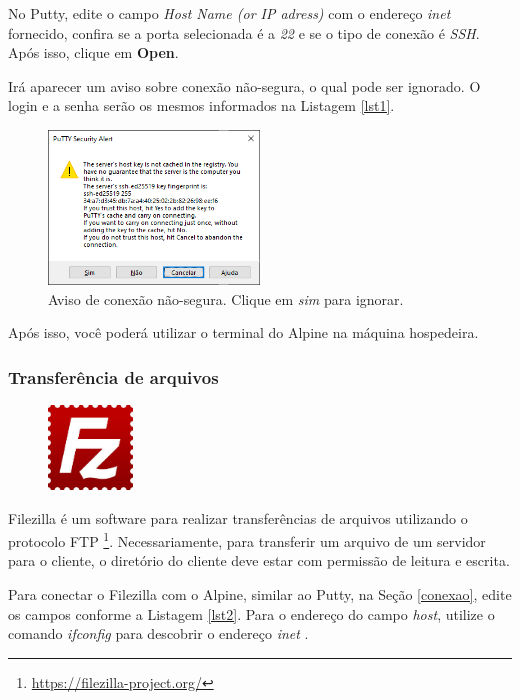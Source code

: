  No Putty, edite o campo \textit{Host Name (or IP adress)} com o endereço \textit{inet} fornecido, confira se a porta selecionada é a \textit{22} e se o tipo de conexão é \textit{SSH}. Após isso, clique em \textbf{Open}.

 Irá aparecer um aviso sobre conexão não-segura, o qual pode ser ignorado. O login e a senha serão os mesmos informados na Listagem \ref{lst1}.

 \begin{figure}[h]
    \centering
    \includegraphics[width=0.5\textwidth]{images/putty4.png}
    \caption{Aviso de conexão não-segura. Clique em \textit{sim} para ignorar.}
    \label{fig1}
\end{figure}

Após isso, você poderá utilizar o terminal do Alpine na máquina hospedeira.

\subsubsection{Transferência de arquivos}\label{transfer}

\begin{figure} %
    \centering
    \includegraphics[width=0.2\textwidth]{../images/filezilla.jpg}
\end{figure}

Filezilla é um software para realizar transferências de arquivos utilizando o protocolo FTP \footnote{\url{https://filezilla-project.org/}}. Necessariamente, para transferir um arquivo de um servidor para o cliente, o diretório do cliente deve estar com permissão de leitura e escrita.

Para conectar o Filezilla com o Alpine, similar ao Putty, na Seção \ref{conexao}, edite os campos conforme a Listagem \ref{lst2}. Para o endereço do campo \textit{host}, utilize o comando \textit{ifconfig} para descobrir o endereço \textit{inet} .

